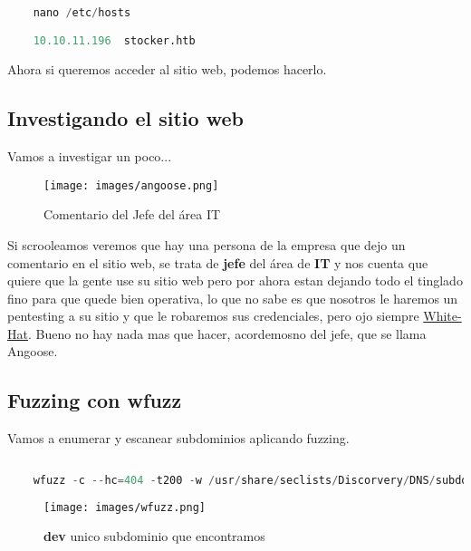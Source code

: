 \documentclass[a4paper]{article} %
\begin{document}
    \begin{lstlisting}[language=Python, caption=Modificamos el archivo que hace el redireccionamiento y agregamos la IP de la máquina con el dominio que obtuvimos con nmap]
         
    nano /etc/hosts

    10.10.11.196  stocker.htb
    \end{lstlisting}
    
    Ahora si queremos acceder al sitio web, podemos hacerlo.

    \subsection{Investigando el sitio web}

    Vamos a investigar un poco...

    \begin{figure}[h] %
        \centering
        \texttt{[image: images/angoose.png]}
        \caption{Comentario del Jefe del área IT} %
    \end{figure} 
    
    Si scrooleamos veremos que hay una persona de la empresa que dejo un comentario en el sitio web, se trata de \textbf{jefe} del área de \textbf{IT} y nos cuenta que quiere que la gente use su sitio web pero por ahora estan dejando todo el tinglado fino para que quede bien operativa, lo que no sabe es que nosotros le haremos un pentesting a su sitio y que le robaremos sus credenciales, pero ojo siempre \underline{White-Hat}.
    Bueno no hay nada mas que hacer, acordemosno del jefe, que se llama Angoose.

    \subsection{Fuzzing con wfuzz}
    Vamos a enumerar y escanear subdominios aplicando fuzzing.

    \begin{lstlisting}[language=Python, caption=Uso wfuzz para enumerar subdominios]
         
    wfuzz -c --hc=404 -t200 -w /usr/share/seclists/Discorvery/DNS/subdomains-top1million-110000ker.txt -u http://stocker.htb --hw 12
    \end{lstlisting}

    \begin{figure}[h] %
        \centering
        \texttt{[image: images/wfuzz.png]}
        \caption{\textbf{dev} unico subdominio que encontramos} %
    \end{figure} 
\end{document}
